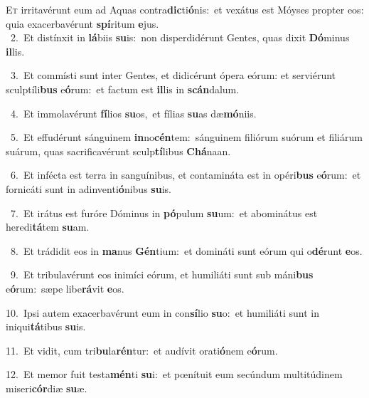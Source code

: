 \lettrine{\initial\textcolor{\initialcolor}{E}}{t} irritavérunt eum ad Aquas contra\-\textbf{dic}\-ti\-\textbf{ó}\-nis:~\star et vexátus est Móyses propter eos: quia exacerbavérunt \textbf{spí}\-ritum \textbf{e}\-jus.\\
{\numbfont\textcolor{\numbcolor}{~2.}}~Et distínxit in \textbf{lá}\-biis \textbf{su}\-is:~\star non disperdidérunt Gentes, quas dixit \textbf{Dó}\-minus \textbf{il}\-lis.\par
{\numbfont\textcolor{\numbcolor}{~3.}}~Et commísti sunt inter Gentes, et didicérunt ópera eórum: et serviérunt sculptíli\textbf{bus} e\-\textbf{ó}\-rum:~\star et factum est \textbf{il}\-lis in \textbf{scán}\-dalum.\par
{\numbfont\textcolor{\numbcolor}{~4.}}~Et immolavérunt \textbf{fí}\-lios \textbf{su}\-os,~\star et fílias \textbf{su}\-as dæ\-\textbf{mó}\-niis.\par
{\numbfont\textcolor{\numbcolor}{~5.}}~Et effudérunt sánguinem \textbf{in}\-no\-\textbf{cén}\-tem:~\star sánguinem filiórum suórum et filiárum suárum, quas sacrificavérunt sculp\-\textbf{tí}\-libus \textbf{Chá}\-naan.\par
{\numbfont\textcolor{\numbcolor}{~6.}}~Et infécta est terra in sanguínibus, et contamináta est in opéri\textbf{bus} e\-\textbf{ó}\-rum:~\star et fornicáti sunt in adinventi\-\textbf{ó}\-nibus \textbf{su}\-is.\par
{\numbfont\textcolor{\numbcolor}{~7.}}~Et irátus est furóre Dóminus in \textbf{pó}\-pulum \textbf{su}\-um:~\star et abominátus est heredi\-\textbf{tá}\-tem \textbf{su}\-am.\par
{\numbfont\textcolor{\numbcolor}{~8.}}~Et trádidit eos in \textbf{ma}\-nus \textbf{Gén}\-tium:~\star et domináti sunt eórum qui o\-\textbf{dé}\-runt \textbf{e}\-os.\par
{\numbfont\textcolor{\numbcolor}{~9.}}~Et tribulavérunt eos inimíci eórum, et humiliáti sunt sub máni\textbf{bus} e\-\textbf{ó}\-rum:~\star sæpe libe\-\textbf{rá}\-vit \textbf{e}\-os.\par
{\numbfont\textcolor{\numbcolor}{10.}}~Ipsi autem exacerbavérunt eum in con\-\textbf{sí}\-lio \textbf{su}\-o:~\star et humiliáti sunt in iniqui\-\textbf{tá}\-tibus \textbf{su}\-is.\par
{\numbfont\textcolor{\numbcolor}{11.}}~Et vidit, cum tri\-\textbf{bu}\-la\-\textbf{rén}\-tur:~\star et audívit orati\-\textbf{ó}\-nem e\-\textbf{ó}\-rum.\par
{\numbfont\textcolor{\numbcolor}{12.}}~Et memor fuit testa\-\textbf{mén}\-ti \textbf{su}\-i:~\star et pœnítuit eum secúndum multitúdinem miseri\-\textbf{cór}\-diæ \textbf{su}\-æ.\par
